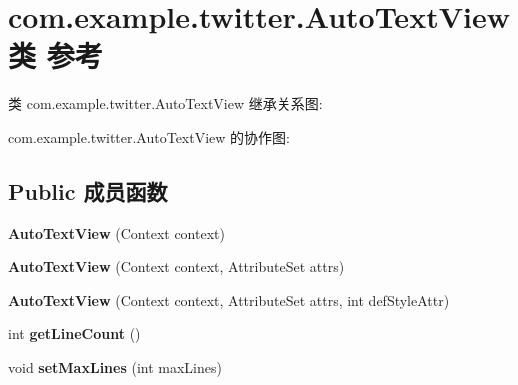 \hypertarget{classcom_1_1example_1_1twitter_1_1_auto_text_view}{}\section{com.\+example.\+twitter.\+Auto\+Text\+View类 参考}
\label{classcom_1_1example_1_1twitter_1_1_auto_text_view}


类 com.\+example.\+twitter.\+Auto\+Text\+View 继承关系图\+:


com.\+example.\+twitter.\+Auto\+Text\+View 的协作图\+:
\subsection*{Public 成员函数}
\begin{DoxyCompactItemize}
\item 
\mbox{\label{classcom_1_1example_1_1twitter_1_1_auto_text_view_a86137622d33a59fac94a479110eea5dc}} 
{\bfseries Auto\+Text\+View} (Context context)
\item 
\mbox{\label{classcom_1_1example_1_1twitter_1_1_auto_text_view_a37a9a39abafdaadf52d6baabb7ac7555}} 
{\bfseries Auto\+Text\+View} (Context context, Attribute\+Set attrs)
\item 
\mbox{\label{classcom_1_1example_1_1twitter_1_1_auto_text_view_aacedbe9b3250af3a277e4f803920eb9a}} 
{\bfseries Auto\+Text\+View} (Context context, Attribute\+Set attrs, int def\+Style\+Attr)
\item 
\mbox{\label{classcom_1_1example_1_1twitter_1_1_auto_text_view_a150730774458d3fb186d2fd3af2c00f6}} 
int {\bfseries get\+Line\+Count} ()
\item 
\mbox{\label{classcom_1_1example_1_1twitter_1_1_auto_text_view_a4857691029f5c5a0a123d4e1100cc3b1}} 
void {\bfseries set\+Max\+Lines} (int max\+Lines)
\end{DoxyCompactItemize}
